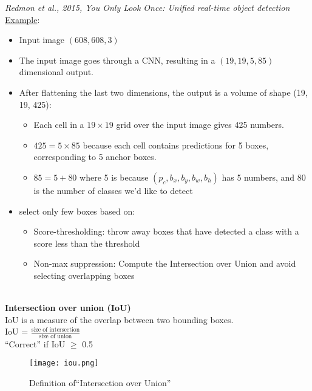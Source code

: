\textit{Redmon et al., 2015, You Only Look Once: Unified real-time object detection}\\
\underline{Example}:
\begin{itemize}
\item
    Input image $(608, 608, 3)$
\item
    The input image goes through a CNN, resulting in a $(19, 19, 5, 85)$ dimensional output.
\item
    After flattening the last two dimensions, the output is a volume of shape (19, 19, 425):
    \begin{itemize}
    \item
    Each cell in a $19 \times19$ grid over the input image gives 425 numbers.
    \item
    $425 = 5 \times 85$ because each cell contains predictions for 5 boxes, corresponding to 5 anchor boxes.
    \item
    $85 = 5 + 80$ where 5 is because $(p_c, b_x, b_y, b_w, b_h)$ has 5 numbers, and 80 is the number of classes we'd like to detect
    \end{itemize}
\item
    select only few boxes based on:
    \begin{itemize}
    \item
    Score-thresholding: throw away boxes that have detected a class with a score less than the threshold
    \item
    Non-max suppression: Compute the Intersection over Union and avoid selecting overlapping boxes
    \end{itemize}
\end{itemize}
~\\
\textbf{Intersection over union (IoU)}\\
IoU is a measure of the overlap between two bounding boxes.\\
IoU = $\displaystyle\frac{\text{size of intersection}}{\text{size of union}}$\\

``Correct'' if IoU $\ge$ 0.5
\begin{figure}[h]
    \centering
    \texttt{[image: iou.png]}
    \caption{Definition of``Intersection over Union''}
    \label{fig:iou}
\end{figure}

